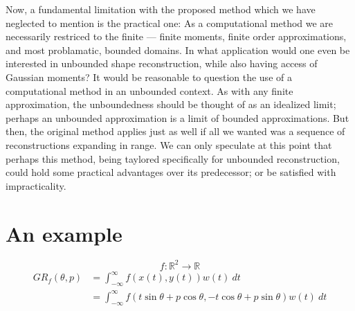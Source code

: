 \documentclass{amsart}
\theoremstyle{remark}
\numberwithin{equation}{section}
\newcommand{\RR}{\mathbb{R}}
\newcommand{\NN}{\mathbb{N}}
\begin{document}
Now, a fundamental limitation with the proposed method which we have neglected to mention is the practical one: As a computational method we are necessarily restriced to the finite — finite moments, finite order approximations, and most problamatic, bounded domains. In what application would one even be interested in unbounded shape reconstruction, while also having access of Gaussian moments? It would be reasonable to question the use of a computational method in an unbounded context. As with any finite approximation, the unboundedness should be thought of as an idealized limit; perhaps an unbounded approximation is a limit of bounded approximations. But then, the original method applies just as well if all we wanted was a sequence of reconstructions expanding in range. We can only speculate at this point that perhaps this method, being taylored specifically for unbounded reconstruction, could hold some practical advantages over its predecessor; or be satisfied with impracticality.

\section{An example}


\[
    f : \RR^2 \rightarrow \RR
\]
\begin{align*}
    GR_f(\theta, p) 
    &= \int_{-\infty}^\infty f(x(t), y(t)) w(t)~dt \\
    &= \int_{-\infty}^\infty f(t \sin\theta + p \cos\theta, -t \cos\theta + p \sin\theta) w(t)~dt
\end{align*}

\end{document}
